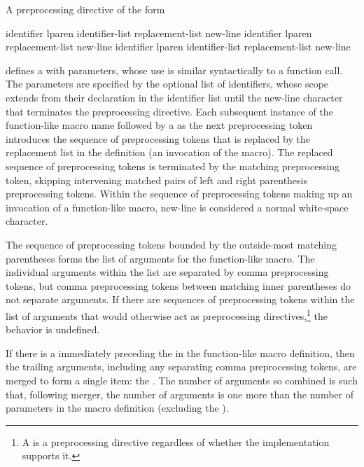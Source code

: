 \pnum
A preprocessing directive of the form

\begin{ncsimplebnf}
 identifier lparen identifier-list\opt{} \terminal{)} replacement-list new-line\br
{} identifier lparen  \terminal{)} replacement-list new-line\br
{} identifier lparen identifier-list  \terminal{)} replacement-list new-line\br
\end{ncsimplebnf}

%
defines a 
with parameters, whose use is
similar syntactically to a function call.
The parameters
%
are specified by the optional list of identifiers,
whose scope extends from their declaration in the identifier list
until the new-line character that terminates the
preprocessing directive.
Each subsequent instance of the function-like macro name followed by a
\tcode{(}
as the next preprocessing token
introduces the sequence of preprocessing tokens that is replaced
by the replacement list in the definition
(an invocation of the macro).
%
The replaced sequence of preprocessing tokens is terminated by the matching
\tcode{)}
preprocessing token, skipping intervening matched pairs of left and
right parenthesis preprocessing tokens.
Within the sequence of preprocessing tokens making up an invocation
of a function-like macro,
new-line is considered a normal white-space character.

\pnum
{}%
The sequence of preprocessing tokens
bounded by the outside-most matching parentheses
forms the list of arguments for the function-like macro.
The individual arguments within the list
are separated by comma preprocessing tokens,
but comma preprocessing tokens between matching
inner parentheses do not separate arguments.
If there are sequences of preprocessing tokens within the list of
arguments that would otherwise act as preprocessing directives,\footnote{A  is a preprocessing directive regardless of whether the implementation supports it.}
the behavior is undefined.

\pnum
{}%
If there is a  immediately preceding the \tcode{)} in the
function-like macro
definition, then the trailing arguments, including any separating comma preprocessing
tokens, are merged to form a single item: the . The number of
arguments so combined is such that, following merger, the number of arguments is
one more than the number of parameters in the macro definition (excluding the
).

